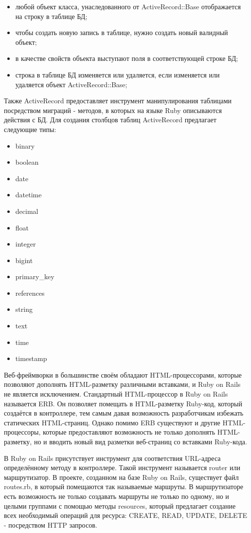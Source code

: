 \begin{itemize}
  \item любой объект класса, унаследованного от ActiveRecord::Base отображается на строку в таблице БД;
  \item чтобы создать новую запись в таблице, нужно создать новый валидный объект;
  \item в качестве свойств объекта выступают поля в соответствующей строке БД;
  \item строка в таблице БД изменяется или удаляется, если изменяется или удаляется объект ActiveRecord::Base;
\end{itemize}

Также ActiveRecord предоставляет инструмент манипулирования таблицами посредством миграций - методов, в которых на языке Ruby описываются действия с БД. Для создания столбцов таблиц ActiveRecord предлагает следующие типы:

\begin{itemize}
  \item binary
  \item boolean
  \item date
  \item datetime
  \item decimal
  \item float
  \item integer
  \item bigint
  \item primary\_key
  \item references
  \item string
  \item text
  \item time
  \item timestamp
\end{itemize}

Веб-фреймворки в большинстве своём обладают HTML-процессорами, которые позволяют дополнять HTML-разметку различными вставками, и Ruby on Rails не является исключением. Стандартный HTML-процессор в Ruby on Rails называется ERB. Он позволяет помещать в HTML-разметку Ruby-код, который создаётся в контроллере, тем самым давая возможность разработчикам избежать статических HTML-страниц. Однако помимо ERB существуют и другие HTML-процессоры, которые предоставляют возможность не только дополнять HTML-разметку, но и вводить новый вид разметки веб-страниц со вставками Ruby-кода.

В Ruby on Rails присутствует инструмент для соответствия URL-адреса определённому методу в контроллере. Такой инструмент называется router или маршрутизатор. В проекте, созданном на базе Ruby on Rails, существует файл routes.rb, в который помещаются так называемые маршруты. В маршрутизаторе есть возможность не только создавать маршруты не только по одному, но и целыми группами с помощью методы resources, который предлагает создание всех необходимый операций для ресурса: CREATE, READ, UPDATE, DELETE - посредством HTTP запросов.


